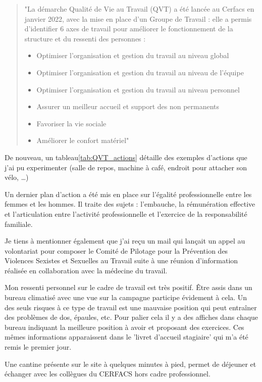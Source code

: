     \begin{quote}
        \setlength{\leftmargin}{0.5cm} %
        \setlength{\rightmargin}{0.5cm} %
        "La démarche Qualité de Vie au Travail (QVT) a été lancée au Cerfacs en janvier 2022, avec la mise en
        place d’un Groupe de Travail : elle a permis d’identifier 6 axes de travail pour améliorer le
        fonctionnement de la structure et du ressenti des personnes :
        \begin{itemize}
            \item Optimiser l’organisation et gestion du travail au niveau global
            \item Optimiser l’organisation et gestion du travail au niveau de l’équipe
            \item Optimiser l’organisation et gestion du travail au niveau personnel
            \item Assurer un meilleur accueil et support des non permanents
            \item Favoriser la vie sociale
            \item Améliorer le confort matériel"
        \end{itemize}
    \end{quote}

    De nouveau, un tableau\ref{tab:QVT_actions} détaille des exemples d'actions que j'ai pu experimenter (salle de repos, machine à café, endroit pour attacher son vélo, \dots)

    Un dernier plan d'action a été mis en place sur l'égalité professionnelle entre les femmes et les hommes. Il traite des sujets : l’embauche, la rémunération effective et l’articulation entre l’activité professionnelle et l’exercice de la responsabilité familiale.

    Je tiens à mentionner également que j'ai reçu un mail qui lançait un appel au volontariat pour composer le Comité de Pilotage pour la Prévention des Violences Sexistes et Sexuelles au Travail suite à une réunion d'information réalisée en collaboration avec la médecine du travail.

\newpage


Mon ressenti personnel sur le cadre de travail est très positif. Être assis dans un bureau climatisé avec une vue sur la campagne participe évidement à cela. Un des seuls risques à ce type de travail est une mauvaise position qui peut entraîner des problèmes de dos, épaules, etc. Pour palier cela il y a des affiches dans chaque bureau indiquant la meilleure position à avoir et proposant des exercices. Ces mêmes informations apparaissent dans le 'livret d'accueil stagiaire' qui m'a été remis le premier jour.

Une cantine présente sur le site à quelques minutes à pied, permet de déjeuner et échanger avec les collègues du CERFACS hors cadre professionnel.